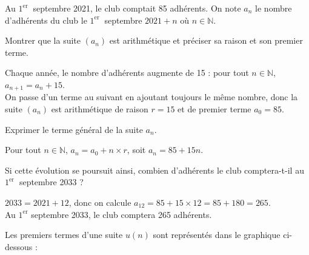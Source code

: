 \documentclass[11pt,a4paper]{article}  %
\begin{document}
Au $1^{\text {er }}$ septembre 2021, le club comptait 85 adhérents.
On note $a_n$ le nombre d'adhérents du club le $1^{\text {er }}$ septembre $2021+n$ où $n \in \mathbb{N}$.
\begin{enumMet}
	\item Montrer que la suite $\left(a_n\right)$ est arithmétique et préciser sa raison et son premier terme.
	\par
	\begin{corrBox}
		Chaque année, le nombre d'adhérents augmente de 15 : pour tout $n\in\mathbb{N}$, $a_{n+1}=a_n+15$.\\
		On passe d'un terme au suivant en ajoutant toujours le même nombre, donc la suite $\left(a_n\right)$ est arithmétique de raison $r=15$ et de premier terme $a_0=85$.
	\end{corrBox}

	\item Exprimer le terme général de la suite $a_n$.
	\par
	\begin{corrBox}
		Pour tout $n\in\mathbb{N}$, $a_n=a_0+n\times r$, soit $a_n=85+15n$.
	\end{corrBox}

	\item Si cette évolution se poursuit ainsi, combien d'adhérents le club comptera-t-il au $1^{\text {er }}$ septembre 2033 ?
	\par
	\begin{corrBox}
		$2033=2021+12$, donc on calcule $a_{12}=85+15\times 12=85+180=265$.\\
		Au $1^{\text{er}}$ septembre 2033, le club comptera 265 adhérents.
	\end{corrBox}
\end{enumMet}


Les premiers termes d'une suite $u(n)$ sont représentés dans le graphique ci-dessous :

\begin{center}
\end{center}
\end{document}
